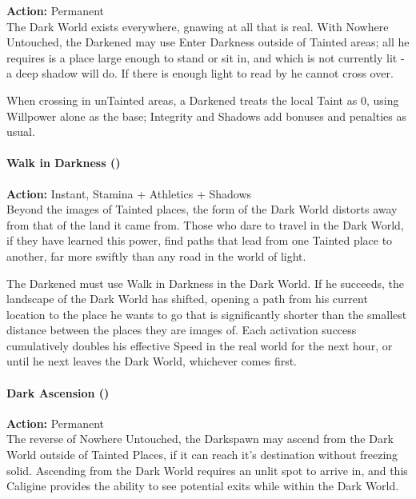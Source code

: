 \noindent \textbf{Action:} Permanent \\

\noindent The Dark World exists everywhere, gnawing at all that is real. With Nowhere Untouched, the Darkened may use Enter Darkness outside of Tainted areas; all he requires is a place large enough to stand or sit in, and which is not currently lit - a deep shadow will do. If there is enough light to read by he cannot cross over.

When crossing in unTainted areas, a Darkened treats the local Taint as 0, using Willpower alone as the base; Integrity and Shadows add bonuses and penalties as usual.\\

\paragraph*{Walk in Darkness (\textbullet\textbullet\textbullet)} 

\noindent \textbf{Action:} Instant, Stamina + Athletics + Shadows \\

\noindent Beyond the images of Tainted places, the form of the Dark World distorts away from that of the land it came from. Those who dare to travel in the Dark World, if they have learned this power, find paths that lead from one Tainted place to another, far more swiftly than any road in the world of light.

The Darkened must use Walk in Darkness in the Dark World. If he succeeds, the landscape of the Dark World has shifted, opening a path from his current location to the place he wants to go that is significantly shorter than the smallest distance between the places they are images of. Each activation success cumulatively doubles his effective Speed in the real world for the next hour, or until he next leaves the Dark World, whichever comes first. \\

\paragraph*{Dark Ascension (\textbullet\textbullet\textbullet\textbullet)} 

\noindent \textbf{Action:} Permanent\\

The reverse of Nowhere Untouched, the Darkspawn may ascend from the Dark World outside of Tainted Places, if it can reach it's destination without freezing solid. Ascending from the Dark World requires an unlit spot to arrive in, and this Caligine provides the ability to see potential exits while within the Dark World. 


